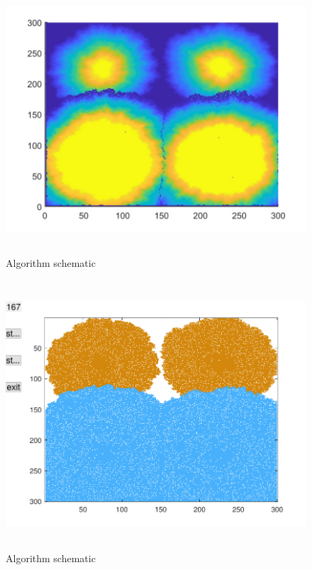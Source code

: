 \documentclass{mcmthesis}
\begin{document}
\begin{figure}[H] 
	\centering 
	\includegraphics[height=10cm]{./T5Figure/K2N1/K2N1A.pdf}
	\caption{Algorithm schematic}
\end{figure}
\begin{figure}[H] 
	\centering 
	\includegraphics[height=10cm]{./T5Figure/K2N1/K2N1F.pdf}
	\caption{Algorithm schematic}
\end{figure}
\end{document}
